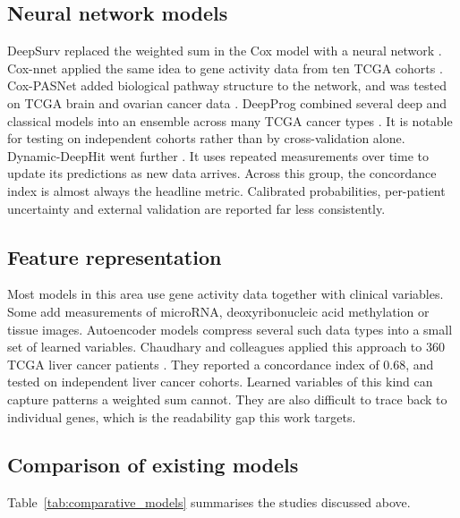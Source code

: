 \documentclass[10pt,a4paper]{article}
\begin{document}
\subsection{Neural network models}

DeepSurv replaced the weighted sum in the Cox model with a neural network
\citep{katzman2018deepsurv}. Cox-nnet applied the same idea to gene activity
data from ten TCGA cohorts \citep{ching2018coxnnet}. Cox-PASNet added biological
pathway structure to the network, and was tested on TCGA brain and ovarian
cancer data \citep{hao2019coxpasnet}. DeepProg combined several deep and
classical models into an ensemble across many TCGA cancer types
\citep{poirion2021deepprog}. It is notable for testing on independent cohorts
rather than by cross-validation alone. Dynamic-DeepHit went further
\citep{lee2020dynamic}. It uses repeated measurements over time to update its
predictions as new data arrives. Across this group, the concordance index is almost
always the headline metric. Calibrated probabilities, per-patient uncertainty
and external validation are reported far less consistently.

\subsection{Feature representation}

Most models in this area use gene activity data together with clinical
variables. Some add measurements of microRNA, deoxyribonucleic acid methylation
or tissue images. Autoencoder models compress several such data types into a
small set of learned variables. Chaudhary and colleagues applied this approach
to 360 TCGA liver cancer patients \citep{chaudhary2018deep}. They reported a
concordance index of 0.68, and tested on independent liver cancer cohorts. Learned
variables of this kind can capture patterns a weighted sum cannot. They are also
difficult to trace back to individual genes, which is the readability gap this
work targets.

\subsection{Comparison of existing models}

Table~\ref{tab:comparative_models} summarises the studies discussed above.
\end{document}
